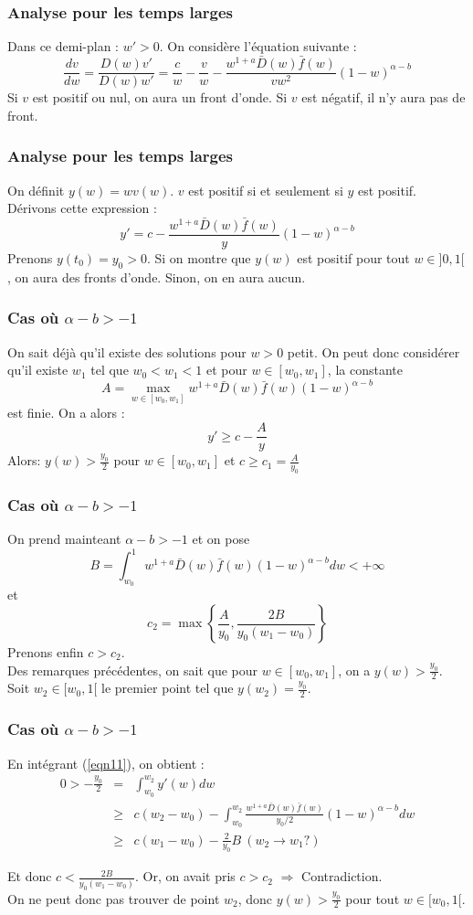 \documentclass[handout]{beamer}
\begin{document}
\begin{frame}
	\frametitle{Analyse pour les temps larges}
Dans ce demi-plan : $w'>0$. On considère l'équation suivante : 
\[\frac{dv}{dw} = \frac{D(w)v'}{D(w)w'}=\frac{c}{w}-\frac{v}{w}-\frac{w^{1+a}\bar{D}(w)\bar{f}(w)}{vw^2}(1-w)^{\alpha-b}\]
Si $v$ est positif ou nul, on aura un front d'onde. Si $v$ est négatif, il n'y aura pas de front. 
\end{frame}

\begin{frame}
	\frametitle{Analyse pour les temps larges}
On définit $y(w)=wv(w)$. $v$ est positif si et seulement si $y$ est positif. Dérivons cette expression : 
\begin{equation} \label{eqn11} y'=c-\frac{w^{1+a}\bar{D}(w)\bar{f}(w)}{y}(1-w)^{\alpha-b}\end{equation}
Prenons $y(t_0)=y_0>0$. Si on montre que $y(w)$ est positif pour tout $w\in]0,1[$, on aura des fronts d'onde. Sinon, on en aura aucun.
\end{frame}

\begin{frame}
	\frametitle{Cas où $\alpha-b>-1$}
On sait déjà qu'il existe des solutions pour $w>0$ petit. On peut donc considérer qu'il existe $w_1$ tel que $w_0<w_1<1$ et pour $w\in[w_0,w_1]$, la constante 
\[A=\max_{w\in[w_0,w_1]}w^{1+a}\bar{D}(w)\bar{f}(w)(1-w)^{\alpha-b}\]
est finie. On a alors : \[y'\geq c-\frac{A}{y}\]
Alors: $y(w)>\frac{y_0}{2}$ pour $w\in[w_0,w_1]$ et $c\geq c_1=\frac{A}{y_0}$
\end{frame}

\begin{frame}
	\frametitle{Cas où $\alpha-b>-1$}
On prend mainteant $\alpha-b>-1$ et on pose \[B=\int_{w_0}^1 w^{1+a}\bar{D}(w)\bar{f}(w)(1-w)^{\alpha-b}dw<+\infty\]
et \[c_2=\max \left\{\frac{A}{y_0}, \frac{2B}{y_0(w_1-w_0)}\right\}\]
Prenons enfin $c>c_2$.\\
Des remarques précédentes, on sait que pour $w\in[w_0,w_1]$, on a $y(w)>\frac{y_0}{2}$. Soit $w_2\in[w_0,1[$ le premier point tel que $y(w_2)=\frac{y_0}{2}$. 
\end{frame}

\begin{frame}
	\frametitle{Cas où $\alpha-b>-1$}
En intégrant (\ref{eqn11}), on obtient : 
\begin{eqnarray*}
	0>-\frac{y_0}{2}&=&\int_{w_0}^{w_2} y'(w)dw\\
			&\geq& c(w_2-w_0) - \int_{w_0}^{w_2} \frac{w^{1+a}\bar{D}(w)\bar{f}(w)}{y_0/2}(1-w)^{\alpha-b} dw\\
			&\geq& c(w_1-w_0) - \frac{2}{y_0} B\ (w_2\rightarrow w_1 ?)
\end{eqnarray*}

Et donc $c<\frac{2B}{y_0(w_1-w_0)}$. Or, on avait pris $c>c_2$ $\Rightarrow$ Contradiction. \\
On ne peut donc pas trouver de point $w_2$, donc $y(w)>\frac{y_0}{2}$ pour tout $w\in[w_0,1[$.
\end{frame}
\end{document}
